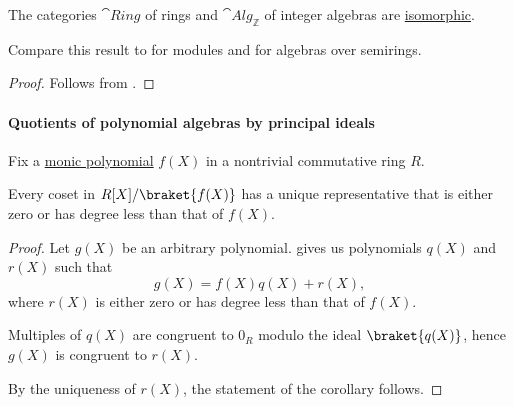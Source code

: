 \begin{proposition}\label{thm:ring_is_integer_algebra}
  The categories \( \hyperref[def:ring/category]{\cat{Ring}} \) of rings and \( \hyperref[def:algebra_over_ring/category]{\cat{Alg}_\BbbZ} \) of integer algebras are \hyperref[rem:category_similarity/isomorphism]{isomorphic}.
\end{proposition}
\begin{comments}
  \item Compare this result to  for modules and  for algebras over semirings.
\end{comments}
\begin{proof}
  Follows from .
\end{proof}

\paragraph{Quotients of polynomial algebras by principal ideals}

\begin{proposition}\label{thm:representatives_in_univariate_polynomial_quotient_set}
  Fix a \hyperref[def:monic_polynomial]{monic polynomial} \( f(X) \) in a nontrivial commutative ring \( R \).

  Every coset in \( R[X] / \braket{ f(X) } \) has a unique representative that is either zero or has degree less than that of \( f(X) \).
\end{proposition}
\begin{proof}
  Let \( g(X) \) be an arbitrary polynomial.  gives us polynomials \( q(X) \) and \( r(X) \) such that
  \begin{equation*}
    g(X) = f(X) q(X) + r(X),
  \end{equation*}
  where \( r(X) \) is either zero or has degree less than that of \( f(X) \).

  Multiples of \( q(X) \) are congruent to \( 0_R \) modulo the ideal \( \braket{ q(X) } \), hence \( g(X) \) is congruent to \( r(X) \).

  By the uniqueness of \( r(X) \), the statement of the corollary follows.
\end{proof}

